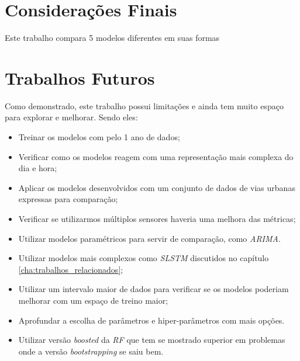 
\section{Considerações Finais}

Este trabalho compara 5 modelos diferentes em suas formas 

\section{Trabalhos Futuros}

Como demonstrado, este trabalho possui limitações e ainda tem muito espaço para explorar e melhorar. Sendo eles:

\begin{itemize}
    \item Treinar os modelos com pelo 1 ano de dados;
    \item Verificar como os modelos reagem com uma representação mais complexa do dia e hora;
    \item Aplicar os modelos desenvolvidos com um conjunto de dados de vias urbanas expressas para comparação;
    \item Verificar se utilizarmos múltiplos sensores haveria uma melhora das métricas;
    \item Utilizar modelos paramétricos para servir de comparação, como \textit{\acrshort{ARIMA}}.
    \item Utilizar modelos mais complexos como \textit{\acrshort{SLSTM}} discutidos no capítulo \ref{cha:trabalhos_relacionados};
    \item Utilizar um intervalo maior de dados para verificar se os modelos poderiam melhorar com um espaço de treino maior;
    \item Aprofundar a escolha de parâmetros e hiper-parâmetros com mais opções.
    \item Utilizar versão \textit{boosted} da \textit{\acrshort{RF}} que tem se mostrado superior em problemas onde a versão \textit{bootstrapping} se saiu bem.
\end{itemize}